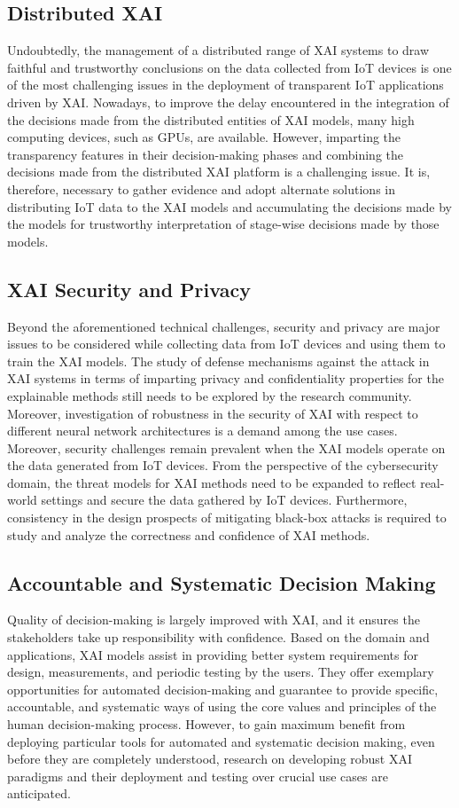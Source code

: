 \documentclass[journal]{IEEEtran}
\begin{document}
\subsection{Distributed XAI}
Undoubtedly, the management of a distributed range of XAI systems to draw faithful and trustworthy conclusions on the data collected from IoT devices is one of the most challenging issues in the deployment of transparent IoT applications driven by XAI. Nowadays, to improve the delay encountered in the integration of the decisions made from the distributed entities of XAI models, many high computing devices, such as GPUs, are available. However, imparting the transparency features in their decision-making phases and combining the decisions made from the distributed XAI platform is a challenging issue. It is, therefore, necessary to gather evidence and adopt alternate solutions in distributing IoT data to the XAI models and accumulating the decisions made by the models for trustworthy interpretation of stage-wise decisions made by those models. 

\subsection{XAI Security and Privacy}
Beyond the aforementioned technical challenges, security and privacy are major issues to be considered while collecting data from IoT devices and using them to train the XAI models. The study of defense mechanisms against the attack in XAI systems in terms of imparting privacy and confidentiality properties for the explainable methods still needs to be explored by the research community. Moreover, investigation of robustness in the security of XAI with respect to different neural network architectures is a demand among the use cases. Moreover, security challenges remain prevalent when the XAI models operate on the data generated from IoT devices. From the perspective of the cybersecurity domain, the threat models for XAI methods need to be expanded to reflect real-world settings and secure the data gathered by IoT devices. Furthermore, consistency in the design prospects of mitigating black-box attacks is required to study and analyze the correctness and confidence of XAI methods. 

\subsection{Accountable and Systematic Decision Making}
Quality of decision-making is largely improved with XAI, and it ensures the stakeholders take up responsibility with confidence. Based on the domain and applications, XAI models assist in providing better system requirements for design, measurements, and periodic testing by the users. They offer exemplary opportunities for automated decision-making and guarantee to provide specific, accountable, and systematic ways of using the core values and principles of the human decision-making process. However, to gain maximum benefit from deploying particular tools for automated and systematic decision making, even before they are completely understood, research on developing robust XAI paradigms and their deployment and testing over crucial use cases are anticipated. 
\end{document}
